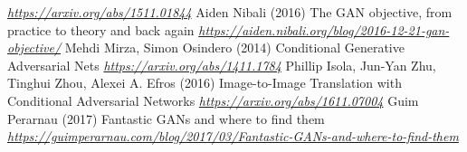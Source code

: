 \begin{vbframe}
{\begin{thebibliography}{99}
\newblock \emph{\url{https://arxiv.org/abs/1511.01844}}
 Aiden Nibali (2016)
\newblock The GAN objective, from practice to theory and back again
\newblock \emph{\url{https://aiden.nibali.org/blog/2016-12-21-gan-objective/}}
 Mehdi Mirza, Simon Osindero (2014)
\newblock Conditional Generative Adversarial Nets
\newblock \emph{\url{https://arxiv.org/abs/1411.1784}}
 Phillip Isola, Jun-Yan Zhu, Tinghui Zhou, Alexei A. Efros (2016)
\newblock Image-to-Image Translation with Conditional Adversarial Networks
\newblock \emph{\url{https://arxiv.org/abs/1611.07004}}
 Guim Perarnau (2017)
\newblock Fantastic GANs and where to find them
\newblock \emph{\url{https://guimperarnau.com/blog/2017/03/Fantastic-GANs-and-where-to-find-them}}


\end{thebibliography}
}
\end{vbframe}

\endlecture

